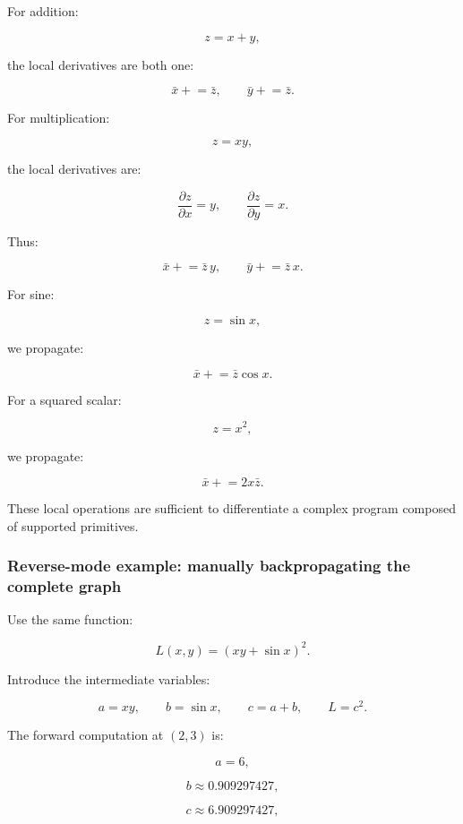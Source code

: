 \hypertarget{02-foundations-ii-ch022-local-reverse-rules}{}

For addition:

\[
z=x+y,
\]

the local derivatives are both one:

\[
\bar x\mathrel{+}=\bar z, \qquad \bar y\mathrel{+}=\bar z.
\]

For multiplication:

\[
z=xy,
\]

the local derivatives are:

\[
\frac{\partial z}{\partial x}=y, \qquad \frac{\partial z}{\partial y}=x.
\]

Thus:

\[
\boxed{ \bar x\mathrel{+}=\bar z\,y, \qquad \bar y\mathrel{+}=\bar z\,x }.
\]

For sine:

\[
z=\sin x,
\]

we propagate:

\[
\boxed{ \bar x\mathrel{+}=\bar z\cos x }.
\]

For a squared scalar:

\[
z=x^2,
\]

we propagate:

\[
\boxed{ \bar x\mathrel{+}=2x\bar z }.
\]

These local operations are sufficient to differentiate a complex program composed of supported primitives.

\subsubsection{Reverse-mode example: manually backpropagating the complete graph}\label{02-foundations-ii-ch022-reverse-mode-example-manually-backpropagating-the-complete-graph}

\hypertarget{02-foundations-ii-ch022-reverse-mode-example-manually-backpropagating-the-complete-graph}{}

Use the same function:

\[
L(x,y)=(xy+\sin x)^2.
\]

Introduce the intermediate variables:

\[
a=xy,\qquad b=\sin x,\qquad c=a+b,\qquad L=c^2.
\]

The forward computation at \((2,3)\) is:

\[
a=6,
\]

\[
b\approx0.909297427,
\]

\[
c\approx6.909297427,
\]


